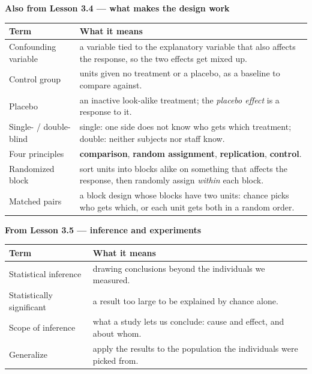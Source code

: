 \documentclass[12pt]{article}
\begin{document}
\vspace{7pt}
\boxguard[12]
\textbf{Also from Lesson 3.4 --- what makes the design work}
\par\vspace{3pt}
\noindent\begin{tabularx}{\linewidth}{@{} l X @{}}
\rowcolor{sky}
\textbf{Term} & \textbf{What it means} \\
\midrule
Confounding variable & a variable tied to the explanatory variable that also affects the
                   response, so the two effects get mixed up. \\
Control group & units given no treatment or a placebo, as a baseline to compare against. \\
Placebo & an inactive look-alike treatment; the \emph{placebo effect} is a response to it. \\
Single- / double-blind & single: one side does not know who gets which treatment; double:
                   neither subjects nor staff know. \\
Four principles & \textbf{comparison}, \textbf{random assignment}, \textbf{replication},
                   \textbf{control}. \\
Randomized block & sort units into blocks alike on something that affects the response, then
                   randomly assign \emph{within} each block. \\
Matched pairs & a block design whose blocks have two units: chance picks who gets which, or
                   each unit gets both in a random order. \\
\end{tabularx}

\vspace{7pt}
\boxguard[9]
\textbf{From Lesson 3.5 --- inference and experiments}
\par\vspace{3pt}
\noindent\begin{tabularx}{\linewidth}{@{} l X @{}}
\rowcolor{sky}
\textbf{Term} & \textbf{What it means} \\
\midrule
Statistical inference & drawing conclusions beyond the individuals we measured. \\
Statistically significant & a result too large to be explained by chance alone. \\
Scope of inference & what a study lets us conclude: cause and effect, and about whom. \\
Generalize & apply the results to the population the individuals were picked from. \\
\end{tabularx}
\end{document}
